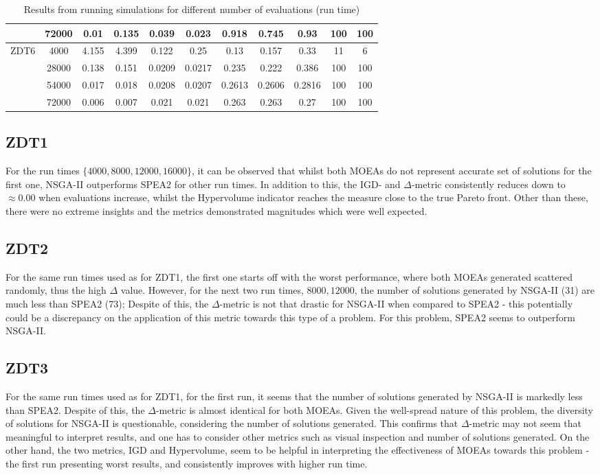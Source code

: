 \documentclass[sigconf, nonacm, preprint]{acmart}
\begin{document}
\begin{table}
\begin{tabular}{|c|c|c|c|c|c|c|c|c|c|c|}
         & 72000 & 0.01 & 0.135 & 0.039 & 0.023 & 0.918 & 0.745 & 0.93 & 100 & 100\\
         \hline
         \multirow{4}{3em}{ZDT6} & 4000 & 4.155 & 4.399 & 0.122 & 0.25 & 0.13 & 0.157 & 0.33 & 11 & 6\\
         & 28000 & 0.138 & 0.151 & 0.0209 & 0.0217 & 0.235 & 0.222 & 0.386 & 100 & 100\\
         & 54000 & 0.017 & 0.018 & 0.0208 & 0.0207 & 0.2613 & 0.2606 & 0.2816 & 100 & 100\\
         & 72000 & 0.006 & 0.007 & 0.021 & 0.021 & 0.263 & 0.263 & 0.27 & 100 & 100\\
         \hline
    \end{tabular}
    \caption{Results from running simulations for different number of evaluations (run time)}
\end{table}
\subsection{ZDT1}
For the run times $\{4000, 8000, 12000, 16000\}$, it can be observed that whilst both MOEAs do not represent accurate set of solutions for the first one, NSGA-II outperforms SPEA2 for other run times. In addition to this, the IGD- and $\Delta$-metric consistently reduces down to $\approx 0.00$ when evaluations increase, whilst the Hypervolume indicator reaches the measure close to the true Pareto front. Other than these, there were no extreme insights and the metrics demonstrated magnitudes which were well expected.
\subsection{ZDT2}
For the same run times used as for ZDT1, the first one starts off with the worst performance, where both MOEAs generated scattered randomly, thus the high $\Delta$ value. However, for the next two run times, ${8000, 12000}$, the number of solutions generated by NSGA-II (31) are much less than SPEA2 (73); Despite of this, the $\Delta$-metric is not that drastic for NSGA-II when compared to SPEA2 - this potentially could be a discrepancy on the application of this metric towards this type of a problem. For this problem, SPEA2 seems to outperform NSGA-II.
\subsection{ZDT3}
For the same run times used as for ZDT1, for the first run, it seems that the number of solutions generated by NSGA-II is markedly less than SPEA2. Despite of this, the $\Delta$-metric is almost identical for both MOEAs. Given the well-spread nature of this problem, the diversity of solutions for NSGA-II is questionable, considering the number of solutions generated. This confirms that $\Delta$-metric may not seem that meaningful to interpret results, and one has to consider other metrics such as visual inspection and number of solutions generated. On the other hand, the two metrics, IGD and Hypervolume, seem to be helpful in interpreting the effectiveness of MOEAs towards this problem - the first run presenting worst results, and consistently improves with higher run time.
\end{document}
